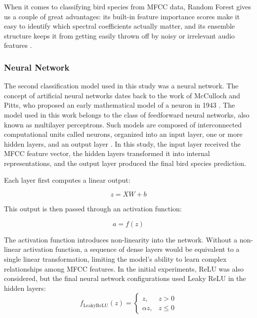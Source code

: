 \documentclass[
onecolumn,
]{ceurart}
\begin{document}
	
	When it comes to classifying bird species from MFCC data, Random Forest gives us a couple of great advantages: its built-in feature importance scores make it easy to identify which spectral coefficients actually matter, and its ensemble structure keeps it from getting easily thrown off by noisy or irrelevant audio features \cite{tang2024recognition, wu2023bird}.
	
	\subsubsection{Neural Network}
	The second classification model used in this study was a neural network. The concept of artificial neural networks dates back to the work of McCulloch and Pitts, who proposed an early mathematical model of a neuron in 1943 \cite{mcculloch1943logical}. The model used in this work belongs to the class of feedforward neural networks, also known as multilayer perceptrons. Such models are composed of interconnected computational units called neurons, organized into an input layer, one or more hidden layers, and an output layer \cite{goodfellow2016deep}. In this study, the input layer received the MFCC feature vector, the hidden layers transformed it into internal representations, and the output layer produced the final bird species prediction.
	

	Each layer first computes a linear output:

	\begin{equation}
		z = XW + b
	\end{equation}

	This output is then passed through an activation function:

	\begin{equation}
		a = f(z)
	\end{equation}
		
	The activation function introduces non-linearity into the network. Without a non-linear activation function, a sequence of dense layers would be equivalent to a single linear transformation, limiting the model's ability to learn complex relationships among MFCC features. In the initial experiments, ReLU was also considered, but the final neural network configurations used Leaky ReLU in the hidden layers:
		\begin{equation}
			f_{\text{LeakyReLU}}(z) =
			\begin{cases}
				z, & z > 0 \\
				\alpha z, & z \leq 0
			\end{cases}
		\end{equation}
	
\end{document}
